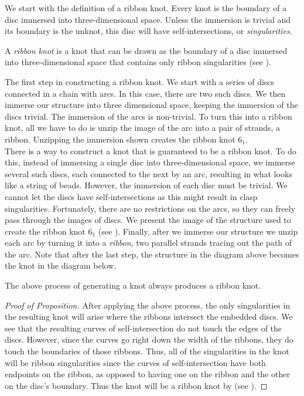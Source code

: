 \begin{paper}
We start with the definition of a ribbon knot.
Every knot is the boundary of a disc immersed into three-dimensional space.
Unless the immersion is trivial and its boundary is the unknot, this disc will
have self-intersections, or \textit{singularities}.

{A \textit{ribbon knot} is a knot that can be drawn as the boundary of a disc
immersed into three-dimensional space that contains only ribbon singularities
(see \figSingularities).}

{The first step in constructing a ribbon knot.
We start with a series of discs connected in a chain with arcs.
In this case, there are two such discs.
We then immerse our structure into three dimensional space, keeping the
immersion of the discs trivial.
The immersion of the arcs is non-trivial.
To turn this into a ribbon knot, all we have to do is unzip the image of the
arc into a pair of strands, a ribbon.
Unzipping the immersion shown creates the ribbon knot $6_1$.}\\

There is a way to construct a knot that is guaranteed to be a ribbon knot.
To do this, instead of immersing a single disc into three-dimensional space, we
immerse several such discs, each connected to the next by an arc, resulting in
what looks like a string of beads.
However, the immersion of each disc must be trivial.
We cannot let the discs have self-intersections as this might result in clasp
singularities.
Fortunately, there are no restrictions on the arcs, so they can freely pass
through the images of discs.
We present the image of the structure used to create the ribbon knot $6_1$ (see
\figImmersion).
Finally, after we immerse our structure we unzip each arc by turning it into a
\textit{ribbon}, two parallel strands tracing out the path of the arc.
Note that after the last step, the structure in the diagram above becomes the
knot in the diagram below.

{The above process of generating a knot always produces a ribbon knot.}
\begin{proof}[Proof of Proposition]
After applying the above process, the only singularities in the resulting knot
will arise where the ribbons intersect the embedded discs.
We see that the resulting curves of self-intersection do not touch the edges of
the discs.
However, since the curves go right down the width of the ribbons, they do touch
the boundaries of those ribbons.
Thus, all of the singularities in the knot will be ribbon singularities since
the curves of self-intersection have both endpoints on the ribbon, as opposed to
having one on the ribbon and the other on the disc's boundary.
Thus the knot will be a ribbon knot by  (see \figSingularities).
\end{proof}


\end{paper}
